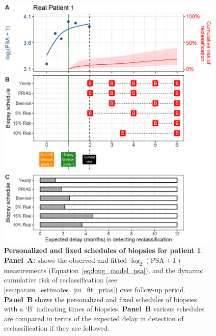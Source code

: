 \begin{figure}
\centerline{\includegraphics[width=\columnwidth]{images/demo_pat1_supp.eps}}
\caption{\textbf{Personalized and fixed schedules of biopsies for patient 1}. \textbf{Panel~A:} shows the observed and fitted $\log_2(\mbox{PSA} + 1)$ measurements (Equation~\ref{eq:long_model_psa}), and the dynamic cumulative risk of reclassification (see \ref{sec:param_estimates_jm_fit_prias}) over follow-up period. \textbf{Panel~B} shows the personalized and fixed schedules of biopsies with a `B' indicating times of biopsies. \textbf{Panel~B} various schedules are compared in terms of the expected delay in detection of reclassification if they are followed.}
\label{fig:demo_pat1_supp}
\end{figure}

